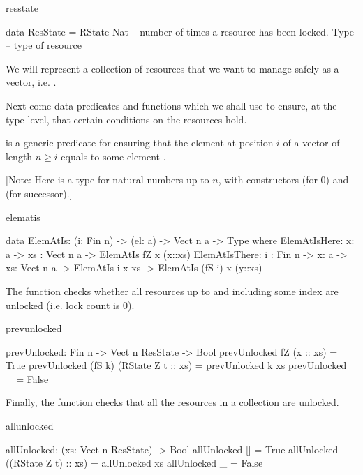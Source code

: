 \begin{SaveVerbatim}{resstate}

data ResState = RState Nat  -- number of times a resource has been locked.
                       Type -- type of resource

\end{SaveVerbatim}

We will represent a collection of resources that we want to manage safely as a
vector, i.e. .

Next come data predicates and functions which we shall use to ensure, at the
type-level, that certain conditions on the resources hold.

 is a generic predicate for ensuring that the element at
position $i$ of a vector of length $n \geq i$ equals to some element .

[Note: Here  is a type for natural numbers up to $n$, with constructors
 (for $0$) and  (for successor).]

\begin{SaveVerbatim}{elematis}

data ElemAtIs: (i: Fin n) -> (el: a) -> Vect n a -> Type where
  ElemAtIsHere:  {x: a} -> {xs : Vect n a} -> ElemAtIs fZ x (x::xs)
  ElemAtIsThere: {i : Fin n} -> {x: a} -> {xs: Vect n a} ->
                                ElemAtIs i x xs ->
                                ElemAtIs (fS i) x (y::xs)

\end{SaveVerbatim}

The  function checks whether all resources up to and
including some index are unlocked (i.e. lock count is 0).

\begin{SaveVerbatim}{prevunlocked}

prevUnlocked: Fin n -> Vect n ResState -> Bool
prevUnlocked fZ (x :: xs) = True
prevUnlocked (fS k) (RState Z t :: xs) = prevUnlocked k xs
prevUnlocked _ _ = False

\end{SaveVerbatim}

Finally, the  function checks that all the resources in a
collection are unlocked.

\begin{SaveVerbatim}{allunlocked}

allUnlocked: (xs: Vect n ResState) -> Bool
allUnlocked [] = True
allUnlocked ((RState Z t) :: xs) = allUnlocked xs
allUnlocked _ = False

\end{SaveVerbatim}

